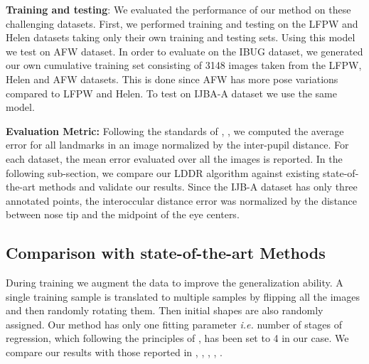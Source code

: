 \documentclass[10pt,twocolumn,letterpaper]{article}
\begin{document}
\par
\textbf{Training and testing}: We evaluated the performance of our method on these challenging datasets.   First, we performed training and testing on the LFPW and Helen datasets taking only their own training and testing sets. Using this model we test on AFW dataset. In order to evaluate on the IBUG dataset, we generated our own cumulative training set consisting of 3148 images taken from the LFPW, Helen and AFW datasets. This is done since AFW has more pose variations compared to LFPW and Helen. To test on IJBA-A dataset we use the same model. \par

\textbf{Evaluation Metric:} Following the standards of \cite{DBLP:journals/ijcv/CaoWWS14}, \cite{Belhumeur:2011:LPF:2191740.2192193}, we computed the average error for all landmarks in an image normalized by the inter-pupil distance. For each dataset, the mean error evaluated over all the images is reported. In the following sub-section, we compare our LDDR algorithm against existing state-of-the-art methods and validate our results.
Since the IJB-A dataset has only three annotated points, the interoccular distance error was normalized by the distance between nose tip and the midpoint of the eye centers.


\subsection{Comparison with state-of-the-art Methods}

During training we augment the data to improve the generalization ability. A single training sample is translated to multiple samples by flipping all the images and then randomly rotating them. Then initial shapes are also randomly assigned. Our method has only one fitting parameter \textit{i.e.} number of stages of regression, which following the principles of \cite{DBLP:conf/cvpr/RenCW014}, \cite{DBLP:journals/ijcv/CaoWWS14} has been set to 4 in our case.    We compare our results with those reported in \cite{DBLP:journals/ijcv/CaoWWS14}, \cite{DBLP:conf/cvpr/RenCW014}, \cite{10.1109/ICCV.2013.191}, \cite{Asthana:2013:RDR:2514950.2516059}, \cite{6909635}.
\end{document}
